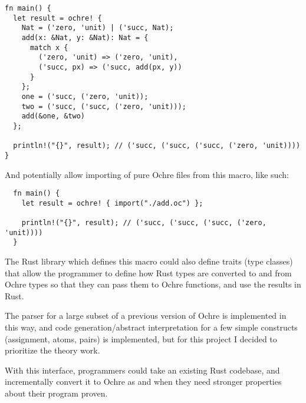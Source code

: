 \documentclass[12pt,twoside]{report}
\begin{document}
\begin{verbatim}
fn main() {
  let result = ochre! {
    Nat = ('zero, 'unit) | ('succ, Nat);
    add(x: &Nat, y: &Nat): Nat = {
      match x {
        ('zero, 'unit) => ('zero, 'unit),
        ('succ, px) => ('succ, add(px, y))
      }
    };
    one = ('succ, ('zero, 'unit));
    two = ('succ, ('succ, ('zero, 'unit)));
    add(&one, &two)
  };

  println!("{}", result); // ('succ, ('succ, ('succ, ('zero, 'unit))))
}
\end{verbatim}

And potentially allow importing of pure Ochre files from this macro, like such:

\begin{verbatim}
  fn main() {
    let result = ochre! { import("./add.oc") };
  
    println!("{}", result); // ('succ, ('succ, ('succ, ('zero, 'unit))))
  }
\end{verbatim}

The Rust library which defines this macro could also define traits (type classes) that allow the programmer to define how Rust types are converted to and from Ochre types so that they can pass them to Ochre functions, and use the results in Rust.

The parser for a large subset of a previous version of Ochre is implemented in this way, and code generation/abstract interpretation for a few simple constructs (assignment, atoms, pairs) is implemented, but for this project I decided to prioritize the theory work.

With this interface, programmers could take an existing Rust codebase, and incrementally convert it to Ochre as and when they need stronger properties about their program proven.


\end{document}
